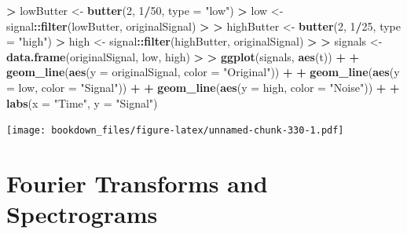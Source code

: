 \documentclass[
]{krantz}
\makeatletter
\newenvironment{Shaded}{\begin{snugshade}}{\end{snugshade}}
\newcommand{\DataTypeTok}[1]{\textcolor[rgb]{0.27,0.27,0.27}{#1}}
\newcommand{\DecValTok}[1]{\textcolor[rgb]{0.06,0.06,0.06}{#1}}
\newcommand{\ErrorTok}[1]{\textcolor[rgb]{0.14,0.14,0.14}{\textbf{#1}}}
\newcommand{\KeywordTok}[1]{\textcolor[rgb]{0.27,0.27,0.27}{\textbf{#1}}}
\newcommand{\NormalTok}[1]{#1}
\newcommand{\OperatorTok}[1]{\textcolor[rgb]{0.43,0.43,0.43}{\textbf{#1}}}
\newcommand{\StringTok}[1]{\textcolor[rgb]{0.5,0.5,0.5}{#1}}
\newenvironment{kframe}{%
\medskip{}
\setlength{\fboxsep}{.8em}
 \def\at@end@of@kframe{}%
 \ifinner\ifhmode%
  \def\at@end@of@kframe{\end{minipage}}%
  \begin{minipage}{\columnwidth}%
 \fi\fi%
 \def\FrameCommand##1{\hskip\@totalleftmargin \hskip-\fboxsep
 \colorbox{shadecolor}{##1}\hskip-\fboxsep
     \hskip-\linewidth \hskip-\@totalleftmargin \hskip\columnwidth}%
 \MakeFramed {\advance\hsize-\width
   \@totalleftmargin\z@ \linewidth\hsize
   \@setminipage}}%
 {\par\unskip\endMakeFramed%
 \at@end@of@kframe}
\renewenvironment{Shaded}{\begin{kframe}}{\end{kframe}}
\makeatother
\begin{document}
\begin{Shaded}
\begin{Highlighting}[]
\OperatorTok{\textgreater{}}\StringTok{ }\NormalTok{lowButter \textless{}{-}}\StringTok{ }\KeywordTok{butter}\NormalTok{(}\DecValTok{2}\NormalTok{, }\DecValTok{1}\OperatorTok{/}\DecValTok{50}\NormalTok{, }\DataTypeTok{type =} \StringTok{"low"}\NormalTok{)}
\OperatorTok{\textgreater{}}\StringTok{ }\NormalTok{low \textless{}{-}}\StringTok{ }\NormalTok{signal}\OperatorTok{::}\KeywordTok{filter}\NormalTok{(lowButter, originalSignal)}
\OperatorTok{\textgreater{}}\StringTok{ }
\ErrorTok{\textgreater{}}\StringTok{ }\NormalTok{highButter \textless{}{-}}\StringTok{ }\KeywordTok{butter}\NormalTok{(}\DecValTok{2}\NormalTok{, }\DecValTok{1}\OperatorTok{/}\DecValTok{25}\NormalTok{, }\DataTypeTok{type =} \StringTok{"high"}\NormalTok{)}
\OperatorTok{\textgreater{}}\StringTok{ }\NormalTok{high \textless{}{-}}\StringTok{ }\NormalTok{signal}\OperatorTok{::}\KeywordTok{filter}\NormalTok{(highButter, originalSignal)}
\OperatorTok{\textgreater{}}\StringTok{ }
\ErrorTok{\textgreater{}}\StringTok{ }\NormalTok{signals \textless{}{-}}\StringTok{ }\KeywordTok{data.frame}\NormalTok{(originalSignal, low, high)}
\OperatorTok{\textgreater{}}\StringTok{ }
\ErrorTok{\textgreater{}}\StringTok{ }\KeywordTok{ggplot}\NormalTok{(signals, }\KeywordTok{aes}\NormalTok{(t)) }\OperatorTok{+}\StringTok{ }
\OperatorTok{+}\StringTok{   }\KeywordTok{geom\_line}\NormalTok{(}\KeywordTok{aes}\NormalTok{(}\DataTypeTok{y =}\NormalTok{ originalSignal, }\DataTypeTok{color =} \StringTok{"Original"}\NormalTok{)) }\OperatorTok{+}\StringTok{ }
\OperatorTok{+}\StringTok{   }\KeywordTok{geom\_line}\NormalTok{(}\KeywordTok{aes}\NormalTok{(}\DataTypeTok{y =}\NormalTok{ low, }\DataTypeTok{color =} \StringTok{"Signal"}\NormalTok{)) }\OperatorTok{+}\StringTok{ }
\OperatorTok{+}\StringTok{   }\KeywordTok{geom\_line}\NormalTok{(}\KeywordTok{aes}\NormalTok{(}\DataTypeTok{y =}\NormalTok{ high, }\DataTypeTok{color =} \StringTok{"Noise"}\NormalTok{)) }\OperatorTok{+}\StringTok{ }
\OperatorTok{+}\StringTok{   }\KeywordTok{labs}\NormalTok{(}\DataTypeTok{x =} \StringTok{"Time"}\NormalTok{, }\DataTypeTok{y =} \StringTok{"Signal"}\NormalTok{)}
\end{Highlighting}
\end{Shaded}

\texttt{[image: bookdown\_files/figure-latex/unnamed-chunk-330-1.pdf]}

\hypertarget{fourier-transforms-and-spectrograms}{%
\section{Fourier Transforms and Spectrograms}\label{fourier-transforms-and-spectrograms}}
\end{document}
